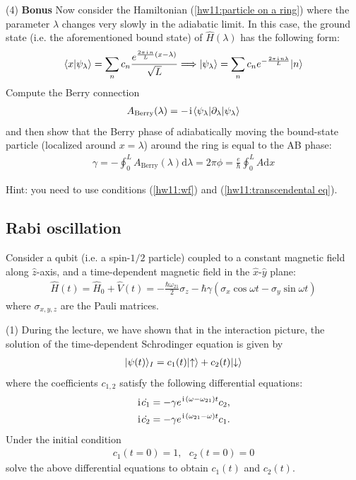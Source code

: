 (4) \textbf{Bonus} Now consider the Hamiltonian (\ref{hw11:particle on a ring}) where the parameter $\lambda$ changes very slowly in the adiabatic limit. In this case, the ground state (i.e. the aforementioned bound state) of $\hat H(\lambda)$ has the following form:
\begin{align}
\langle{x|\psi_\lambda}\rangle=\sum_nc_n\frac{e^{\frac{2\pi\hspace{1pt}\mathrm{i}\hspace{1pt} n}{L}(x-\lambda)}}{\sqrt L}\Longrightarrow|{\psi_\lambda}\rangle=\sum_nc_ne^{-\frac{2\pi\hspace{1pt}\mathrm{i}\hspace{1pt} n\lambda}{L}}|{n}\rangle
\end{align}
Compute the Berry connection
\begin{align}
A_\text{Berry}(\lambda)=-\hspace{1pt}\mathrm{i}\hspace{1pt}\langle{\psi_\lambda|\partial_\lambda|\psi_\lambda}\rangle
\end{align}
and then show that the Berry phase of adiabatically moving the bound-state particle (localized around $x=\lambda$) around the ring is equal to the AB phase:
\begin{align}
\gamma=-\oint_0^LA_\text{Berry}(\lambda)\text{d}\lambda =2\pi\phi=\frac{e}{\hbar}\oint_0^LA\text{d}x
\end{align}

Hint: you need to use conditions (\ref{hw11:wf}) and (\ref{hw11:transcendental eq}).

\subsection{Rabi oscillation}

Consider a qubit (i.e. a spin-$1/2$ particle) coupled to a constant magnetic field along $\hat z$-axis, and a time-dependent magnetic field in the $\hat x$-$\hat y$ plane:
\begin{align}\label{rabi problem}
\hat H(t)=\hat H_0+\hat V(t)=-\frac{\hbar\omega_{21}}2\sigma_z-\hbar\gamma(\sigma_x\cos\omega t-\sigma_y\sin\omega t)
\end{align}
where $\sigma_{x,y,z}$ are the Pauli matrices.

(1) During the lecture, we have shown that in the interaction picture, the solution of the time-dependent Schrodinger equation is given by 
\begin{align}
|{\psi(t)}\rangle_I=c_1(t)|{\uparrow}\rangle+c_2(t)|{\downarrow}\rangle
\end{align}
where the coefficients $c_{1,2}$ satisfy the following differential equations:
\begin{align}
&\hspace{1pt}\mathrm{i}\hspace{1pt}\dot{c_1}=-\gamma e^{\hspace{1pt}\mathrm{i}\hspace{1pt}(\omega-\omega_{21})t}c_2,\\
&\hspace{1pt}\mathrm{i}\hspace{1pt}\dot{c_2}=-\gamma e^{\hspace{1pt}\mathrm{i}\hspace{1pt}(\omega_{21}-\omega)t}c_1.
\end{align}
Under the initial condition
\begin{align}
c_1(t=0)=1,~~~c_2(t=0)=0
\end{align}
solve the above differential equations to obtain $c_1(t)$ and $c_2(t)$. 

